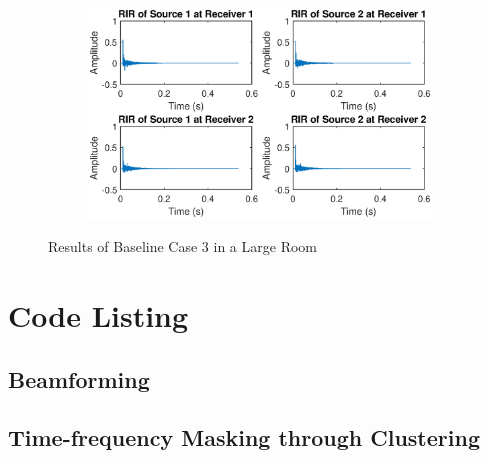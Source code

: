 \documentclass[a4paper,twoside,12pt,hidelinks]{article}
\begin{document}
\begin{appendices}
\begin{figure}[H]
\begin{subfigure}[H]{0.6\textwidth}
\includegraphics[width=\textwidth]{3l_ir}
\end{subfigure}
\caption{Results of Baseline Case 3 in a Large Room}
\end{figure}
\newpage
\twocolumn
\section{Code Listing}
\subsection{Beamforming}
\label{sect:beamformingcode}

\newpage
\subsection{Time-frequency Masking through Clustering}


\end{appendices}
\end{document}
